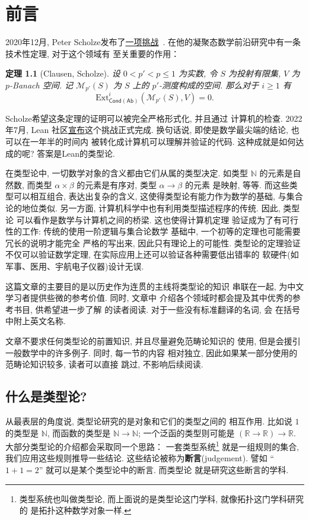 \documentclass[UTF8]{ctexbook}
\theoremstyle{plain}
\newtheorem{theorem}{定理}[chapter]
\theoremstyle{definition}
\theoremstyle{remark}
\begin{document}
\setcounter{tocdepth}{1}
\tableofcontents
\chapter{前言}
2020年12月, Peter Scholze发布了\href{https://xenaproject.wordpress.com/2020/12/05/liquid-tensor-experiment/}{一项挑战}~\cite{scholze:2020:liquid}.
在他的凝聚态数学前沿研究中有一条技术性定理, 对于这个领域有
至关重要的作用：
\begin{theorem}[Clausen, Scholze]
设 \(0 < p' < p \le 1\) 为实数, 令 \(S\) 为投射有限集,
\(V\) 为 \(p\)-Banach 空间. 记 \(\mathcal M_{p'}(S)\)
为 \(S\) 上的 \(p'\)-测度构成的空间. 那么对于 \(i \ge 1\) 有
\[\mathrm{Ext}_{\mathsf{Cond}(\mathsf{Ab})}^i(
  \mathcal M_{p'}(S), V
) = 0.\]
\end{theorem}
Scholze希望这条定理的证明可以被完全严格形式化, 并且通过
计算机的检查. 2022年7月, Lean
社区\href{https://leanprover-community.github.io/blog/posts/lte-final/}{宣布}这个挑战正式完成.
换句话说, 即使是数学最尖端的结论, 也可以在一年半的时间内
被转化成计算机可以理解并验证的代码.
这种成就是如何达成的呢? 答案是Lean的类型论.

在类型论中, 一切数学对象的含义都由它们从属的类型决定.
如类型 \(\mathbb N\) 的元素是自然数, 而类型 \(\alpha \times \beta\)
的元素是有序对, 类型 \(\alpha \to\beta\) 的元素
是映射, 等等. 而这些类型可以相互组合, 表达出复杂的含义,
这使得类型论有能力作为数学的基础, 与集合论的地位类似.
另一方面, 计算机科学中也有利用类型描述程序的传统. 因此, 类型论
可以看作是数学与计算机之间的桥梁. 这也使得计算机定理
验证成为了有可行性的工作: 传统的使用一阶逻辑与集合论数学
基础中, 一个初等的定理也可能需要冗长的说明才能完全
严格的写出来, 因此只有理论上的可能性.
类型论的定理验证不仅可以验证数学定理,
在实际应用上还可以验证各种需要低出错率的
软硬件(如军事、医用、宇航电子仪器)设计无误.


这篇文章的主要目的是以历史作为连贯的主线将类型论的知识
串联在一起, 为中文学习者提供些微的参考价值. 同时, 文章中
介绍各个领域时都会提及其中优秀的参考书目, 供希望进一步了解
的读者阅读. 对于一些没有标准翻译的名词, 会
在括号中附上英文名称.

文章不要求任何类型论的前置知识, 并且尽量避免范畴论知识的
使用, 但是会援引一般数学中的许多例子. 同时, 每一节的内容
相对独立, 因此如果某一部分使用的范畴论知识较多, 读者可以直接
跳过, 不影响后续阅读.


\section{什么是类型论?}
从最表层的角度说, 类型论研究的是对象和它们的类型之间的
相互作用. 比如说 \(1\) 的类型是 \(\mathbb N\),
而函数的类型是 \(\mathbb N \to \mathbb N\);
一个泛函的类型则可能是
\((\mathbb R \to \mathbb R) \to \mathbb R\).
大部分类型论的介绍都会采取同一个思路：
一套类型系统\footnote{类型系统也叫做类型论,
而上面说的是类型论这门学科, 就像拓扑这门学科研究的
是拓扑这种数学对象一样.}%
就是一组规则的集合, 我们应用这些规则推导一些结论.
这些结论被称为\textbf{断言}(judgement). 譬如
“\(1+1=2\)” 就可以是某个类型论中的断言. 而类型论
就是研究这些断言的学科.
\end{document}
